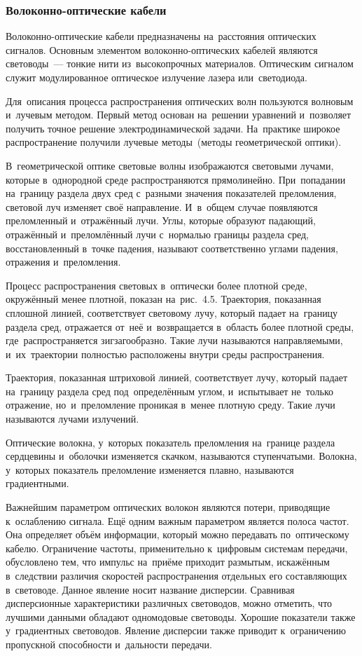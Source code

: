 \documentclass[
	a4paper,
	oneside,
	BCOR = 10mm,
	DIV = 12,
	12pt,
	headings = normal,
]{scrartcl}
\begin{document}
			\subsubsection{Волоконно-оптические кабели}
				Волоконно-оптические кабели предназначены на~расстояния оптических сигналов. Основным элементом волоконно-оптических кабелей являются световоды~— тонкие нити из~высокопрочных материалов. Оптическим сигналом служит модулированное оптическое излучение лазера или~светодиода.

				Для~описания процесса распространения оптических волн пользуются волновым и~лучевым методом. Первый метод основан на~решении уравнений и~позволяет получить точное решение электродинамической задачи. На~практике широкое распространение получили лучевые методы~(методы геометрической оптики).

				В~геометрической оптике световые волны изображаются световыми лучами, которые в~однородной среде распространяются прямолинейно. При~попадании на~границу раздела двух сред с~разными значения показателей преломления, световой луч изменяет своё направление. И~в~общем случае появляются преломленный и~отражённый лучи. Углы, которые образуют падающий, отражённый и~преломлённый лучи с~нормалью границы раздела сред, восстановленный в~точке падения, называют соответственно углами падения, отражения и~преломления.

				Процесс распространения световых в~оптически более плотной среде, окружённый менее плотной, показан на~рис.~4.5. Траектория, показанная сплошной линией, соответствует световому лучу, который падает на~границу раздела сред, отражается от~неё и~возвращается в~область более плотной среды, где~распространяется зигзагообразно. Такие лучи называются направляемыми, и~их~траектории полностью расположены внутри среды распространения.

				Траектория, показанная штриховой линией, соответствует лучу, который падает на~границу раздела сред под~определённым углом, и~испытывает не~только отражение, но~и~преломление проникая в~менее плотную среду. Такие лучи называются лучами излучений. 

				Оптические волокна, у~которых показатель преломления на~границе раздела сердцевины и~оболочки изменяется скачком, называются ступенчатыми. Волокна, у~которых показатель преломление изменяется плавно, называются градиентными.

				Важнейшим параметром оптических волокон являются потери, приводящие к~ослаблению сигнала. Ещё одним важным параметром является полоса частот. Она определяет объём информации, который можно передавать по~оптическому кабелю. Ограничение частоты, применительно к~цифровым системам передачи, обусловлено тем, что импульс на~приёме приходит размытым, искажённым в~следствии различия скоростей распространения отдельных его составляющих в~световоде. Данное явление носит название дисперсии. Сравнивая дисперсионные характеристики различных световодов, можно отметить, что лучшими данными обладают одномодовые световоды. Хорошие показатели также у~градиентных световодов. Явление дисперсии также приводит к~ограничению пропускной способности и~дальности передачи. 
\end{document}
